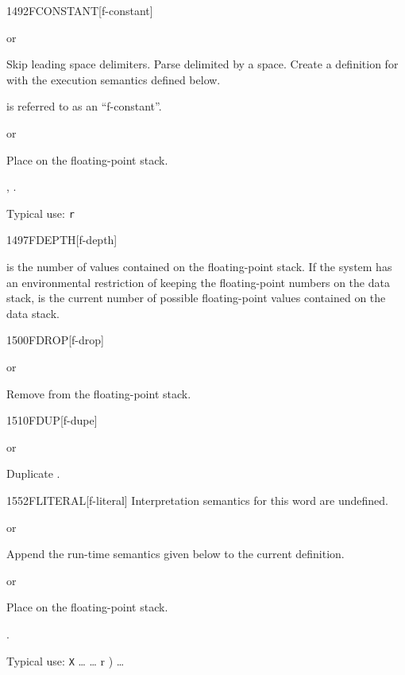 \begin{worddef}{1492}{FCONSTANT}[f-constant]
\item {}  or

	Skip leading space delimiters. Parse  delimited by a
	space. Create a definition for  with the execution
	semantics defined below.

	 is referred to as an ``f-constant''.

\execute[name]
	\stack{}{}  or

	Place  on the floating-point stack.

\see {},
	.

	\begin{rationale} %
		Typical use: \texttt{r}  
	\end{rationale}
\end{worddef}


\begin{worddef}{1497}{FDEPTH}[f-depth]
\item {}

	 is the number of values contained on the
	floating-point stack. If the system has an environmental
	restriction of keeping the floating-point numbers on the
	data stack,  is the current number of possible
	floating-point values contained on the data stack.
\end{worddef}


\begin{worddef}{1500}{FDROP}[f-drop]
\item {} or

	Remove  from the floating-point stack.
\end{worddef}


\begin{worddef}{1510}{FDUP}[f-dupe]
\item {} or

	Duplicate .
\end{worddef}


\begin{worddef}{1552}{FLITERAL}[f-literal]
\interpret
	Interpretation semantics for this word are undefined.

\compile
	 or

	Append the run-time semantics given below to the current
	definition.

\runtime
	 or

	Place  on the floating-point stack.

\see {}.

	\begin{rationale} %
		Typical use:
			\word[core]{:} \texttt{X} {\ldots}
				\word[core]{[} {\ldots}  r ) \word[core]{]}
				 {\ldots}
			\word[core]{;}
	\end{rationale}
\end{worddef}


